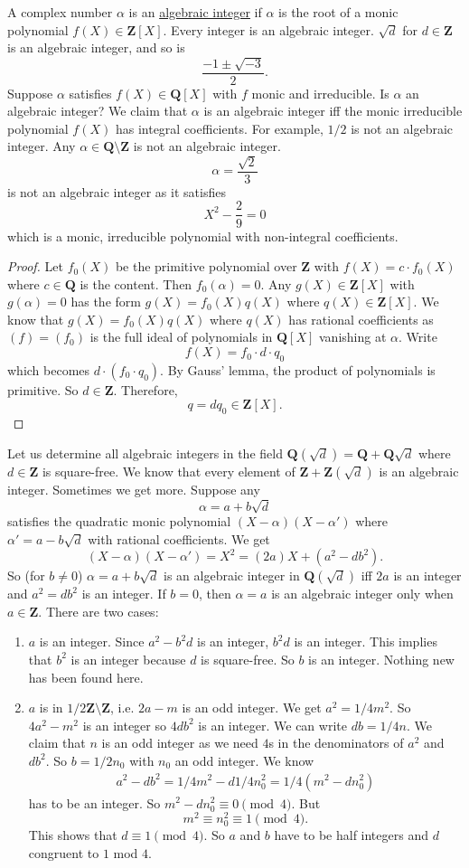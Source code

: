 \documentclass[11pt, oneside]{amsart}
\numberwithin{equation}{section}
\numberwithin{theorem}{section}
\theoremstyle{definition}
\def\Z{\mathbf{Z}}
\def\Q{\mathbf{Q}}
\begin{document}
{A complex number $\alpha$ is an \underline{algebraic integer} if $\alpha$ is the root of a monic polynomial $f(X)\in\Z[X]$. Every integer is an algebraic integer. $\sqrt d$ for $d\in\Z$ is an algebraic integer, and so is
$$
\frac{-1\pm\sqrt{-3}}{2}.
$$
Suppose $\alpha$ satisfies $f(X)\in\Q[X]$ with $f$ monic and irreducible. Is $\alpha$ an algebraic integer? We claim that $\alpha$ is an algebraic integer iff the monic irreducible polynomial $f(X)$ has integral coefficients. For example, $1/2$ is not an algebraic integer. Any $\alpha\in\Q\setminus\Z$ is not an algebraic integer. 
$$
\alpha =\frac{\sqrt{2}}{3}
$$
is not an algebraic integer as it satisfies 
$$
X^2 -\frac{2}{9} = 0
$$
which is a monic, irreducible polynomial with non-integral coefficients.
\begin{proof}
Let $f_0(X)$ be the primitive polynomial over $\Z$ with $f(X) = c\cdot f_0(X)$ where $c\in\Q$ is the content. Then $f_0(\alpha) = 0$. Any $g(X)\in \Z[X]$ with $g(\alpha)=0$ has the form $g(X) = f_0(X)q(X)$ where $q(X) \in \Z[X]$. We know that $g(X) = f_0(X)q(X)$ where $q(X)$ has rational coefficients as $(f) =(f_0)$ is the full ideal of polynomials in $\Q[X]$ vanishing at $\alpha$. Write 
$$
f(X) = f_0\cdot d\cdot q_0
$$
which becomes $d\cdot(f_0\cdot q_0)$. By Gauss' lemma, the product of polynomials is primitive. So $d\in \Z$. Therefore, 
$$
q = dq_0\in\Z[X].
$$
\end{proof}

Let us determine all algebraic integers in the field $\Q(\sqrt d) = \Q +\Q\sqrt d$ where $d\in\Z$ is square-free. We know that every element of $\Z+\Z(\sqrt d)$ is an algebraic integer. Sometimes we get more. Suppose any
$$
\alpha = a+b\sqrt d
$$
satisfies the quadratic monic polynomial $(X-\alpha)(X-\alpha')$ where $\alpha' = a-b\sqrt d $ with rational coefficients. We get
$$
(X-\alpha)(X-\alpha') = X^2 = (2a)X + (a^2-db^2).
$$
So (for $b\neq 0$) $\alpha=a+b\sqrt d$ is an algebraic integer in $\Q(\sqrt d)$ iff $2a$ is an integer and $a^2 = db^2$ is an integer. If $b=0$, then $\alpha = a$ is an algebraic integer only when $a\in\Z$. There are two cases:
\begin{enumerate}[label=(\roman*)]
\item $a$ is an integer. Since $a^2-b^2d$ is an integer, $b^2d$ is an integer. This implies that $b^2$ is an integer because $d$ is square-free. So $b$ is an integer. Nothing new has been found here.
\item $a$ is in $1/2\Z\setminus\Z$, i.e. $2a - m$ is an odd integer. We get $a^2 = 1/4m^2$. So $4a^2-m^2$ is an integer so $4db^2$ is an integer. We can write $db = 1/4n$. We claim that $n$ is an odd integer as we need $4$s in the denominators of $a^2$ and $db^2$. So $b=1/2n_0$ with $n_0$ an odd integer. We know
\begin{align*}
a^2 - db^2 = 1/4m^2 - d 1/4 n_0^2 = 1/4(m^2 - dn_0^2)
\end{align*}
has to be an integer. So $m^2 - dn_0^2 \equiv 0\pmod 4$. But 
$$
m^2\equiv n_0^2 \equiv 1\pmod 4.
$$
This shows that $d\equiv 1\pmod 4$. So $a$ and $b$ have to be half integers and $d$ congruent to $1$ mod $4$.
\end{enumerate}

}
\end{document}
